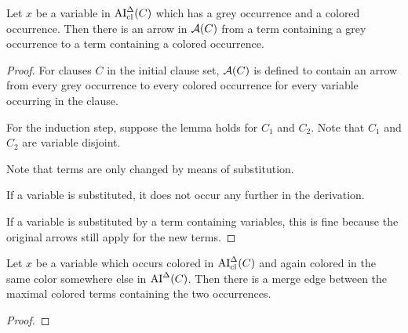 \documentclass[,%
	paper=a4,%
	DIV10, %
	twoside=false,%
	liststotoc,
	bibtotoc,
	draft=false,%
	numbers=noendperiod
]{scrartcl}
\begin{document}
\begin{lemma}
	\label{lemma:arrow_from_grey_to_colored}
	Let $x$ be a variable in $\operatorname{AI}_\mathrm{cl}^\Delta(C)$ which has a grey occurrence and a colored occurrence. 
	Then there is an arrow in $\operatorname{\mathcal{A}}(C)$ from a term containing a grey occurrence to a term containing a colored occurrence.
\end{lemma}
\begin{proof}
	For clauses $C$ in the initial clause set, $\operatorname{\mathcal{A}}(C)$ is defined to contain an arrow from every grey occurrence to every colored occurrence for every variable occurring in the clause.  

	For the induction step, suppose the lemma holds for $C_1$ and $C_2$. 
	Note that $C_1$ and $C_2$ are variable disjoint.

	Note that terms are only changed by means of substitution. 

	If a variable is substituted, it does not occur any further in the derivation. 

	If a variable is substituted by a term containing variables, this is fine because the original arrows still apply for the new terms. 
\end{proof}

\begin{lemma}
	\label{lemma:arrow_from_colored_to_colored}
	Let $x$ be a variable which occurs colored in $\operatorname{AI}_\mathrm{cl}^\Delta(C)$ and again colored in the same color somewhere else in $\operatorname{AI}^\Delta(C)$.
	Then there is a merge edge between the maximal colored terms containing the two occurrences.
\end{lemma}
\begin{proof}
	\mytodo{}
\end{proof}
\end{document}

